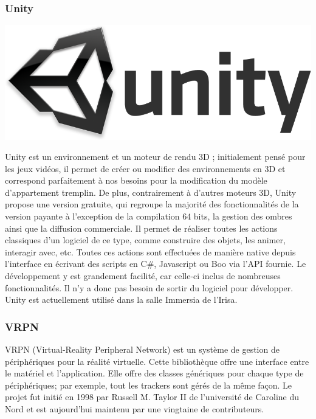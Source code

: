 	\subsubsection{Unity}
		\noindent\begin{minipage}{0.3\textwidth}
			\includegraphics[width=\linewidth]{1-PreEtude/img/unity_logo}
			\end{minipage}
			\hfill
			\begin{minipage}{0.65\textwidth}
			Unity\cite{unity} est un environnement et un moteur de rendu 3D ; initialement pensé pour les jeux vidéos, il permet de créer ou modifier des environnements en 3D et correspond parfaitement à nos besoins pour la modification du modèle d'appartement tremplin.
			De plus, contrairement à d'autres moteurs 3D, Unity propose une version gratuite, qui regroupe la majorité des fonctionnalités de la version payante à l'exception de la compilation 64 bits, la gestion des ombres ainsi que la diffusion commerciale.
			Il permet de réaliser toutes les actions classiques d'un logiciel de ce type, comme construire des objets, les animer, interagir avec, etc. Toutes ces actions sont effectuées de manière native depuis l'interface en écrivant des scripts en C\#, Javascript ou Boo via l'API fournie.
			Le développement y est grandement facilité, car celle-ci inclus de nombreuses fonctionnalités. Il n'y a donc pas besoin de sortir du logiciel pour développer.
			Unity est actuellement utilisé dans la salle Immersia de l'Irisa.
		\end{minipage}


	\subsubsection{VRPN}

		VRPN\cite{vrpn} (Virtual-Reality Peripheral Network) est un système de gestion de périphériques pour la réalité virtuelle. Cette bibliothèque offre une interface entre le matériel et l'application. Elle offre des classes génériques pour chaque type de périphériques; par exemple, tout les trackers sont gérés de la même façon.
		Le projet fut initié en 1998 par Russell M. Taylor II de l'université de Caroline du Nord et est aujourd'hui maintenu par une vingtaine de contributeurs.


